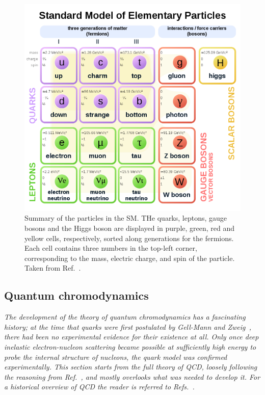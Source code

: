 \begin{figure}[hbtp]
  \begin{center}
    \includegraphics[width=0.7\linewidth]{img/theory/particles.png}
    \caption{
        Summary of the particles in the SM.
        THe quarks, leptons, gauge bosons and the Higgs boson are displayed in purple, green, red and yellow cells, respectively, sorted along generations for the fermions.
        Each cell contains three numbers in the top-left corner, corresponding to the mass, electric charge, and spin of the particle.
        Taken from Ref.~\cite{particles-wikicommons}.
        }
    \label{fig:particles}
  \end{center}
\end{figure}




\subsection{Quantum chromodynamics}

\textit{%
The development of the theory of quantum chromodynamics has a fascinating history; at the time that quarks were first postulated by Gell-Mann and Zweig~\cite{griffiths}, there had been no experimental evidence for their existence at all.
% 
Only once deep inelastic electron-nucleon scattering became possible at sufficiently high energy to probe the internal structure of nucleons, the quark model was confirmed experimentally.
% 
This section starts from the full theory of QCD, loosely following the reasoning from Ref.~\cite{dissertori}, and mostly overlooks what was needed to develop it.
% 
For a historical overview of QCD the reader is referred to Refs.~\cite{dissertori,griffiths}. 
}


